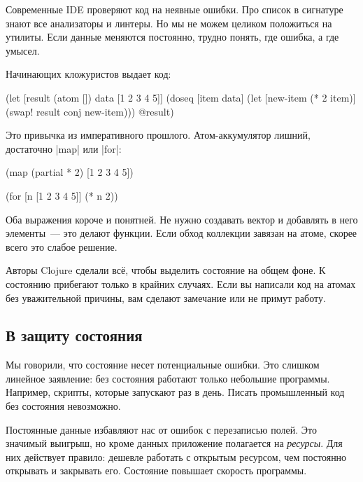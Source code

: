 Современные IDE проверяют код на неявные ошибки. Про список в сигнатуре знают
все анализаторы и линтеры. Но мы не можем целиком положиться на утилиты. Если
данные меняются постоянно, трудно понять, где ошибка, а где умысел.

Начинающих кложуристов выдает код:

\begin{english}
  \begin{clojure}
(let [result (atom [])
      data [1 2 3 4 5]]
  (doseq [item data]
    (let [new-item (* 2 item)]
      (swap! result conj new-item)))
  @result)
  \end{clojure}
\end{english}

\noindent
Это привычка из императивного прошлого. Атом-аккумулятор лишний, достаточно
\spverb|map| или \spverb|for|:

\begin{english}
  \begin{clojure}
(map (partial * 2) [1 2 3 4 5])

(for [n [1 2 3 4 5]]
  (* n 2))
  \end{clojure}
\end{english}

Оба выражения короче и понятней. Не нужно создавать вектор и добавлять в него
элементы~--- это делают функции. Если обход коллекции завязан на
атоме, скорее всего это слабое решение.

Авторы Clojure сделали вс\"{е}, чтобы выделить состояние на общем фоне. К
состоянию прибегают только в крайних случаях. Если вы написали код на атомах без
уважительной причины, вам сделают замечание или не примут работу.

\subsection{В защиту состояния}

Мы говорили, что состояние несет потенциальные ошибки. Это слишком линейное
заявление: без состояния работают только небольшие программы. Например, скрипты,
которые запускают раз в день. Писать промышленный код без состояния невозможно.

Постоянные данные избавляют нас от ошибок с перезаписью полей. Это значимый
выигрыш, но кроме данных приложение полагается на \emph{ресурсы}. Для них
действует правило: дешевле работать с открытым ресурсом, чем постоянно открывать
и закрывать его. Состояние повышает скорость программы.

